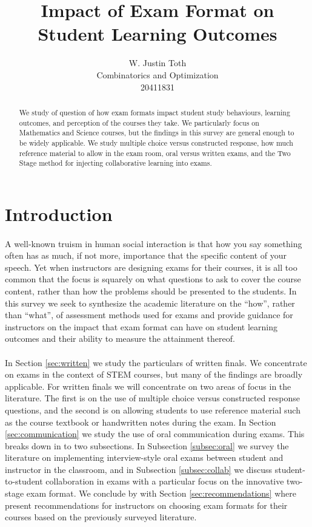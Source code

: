 \documentclass[12pt]{article}
\title{Impact of Exam Format on Student Learning Outcomes}
\author{W. Justin Toth\\Combinatorics and Optimization\\20411831}
\begin{document}
\maketitle
\begin{abstract}
We study of question of how exam formats impact student study behaviours, learning outcomes, and perception of the courses they take. We particularly focus on Mathematics and Science courses, but the findings in this survey are general enough to be widely applicable. We study multiple choice versus constructed response, how much reference material to allow in the exam room, oral versus written exams, and the Two Stage method for injecting collaborative learning into exams.
\end{abstract}
\newpage
\tableofcontents
\newpage
\section{Introduction}

\paragraph{}
A well-known truism in human social interaction is that how you say something often has as much, if not more, importance that the specific content of your speech. Yet when instructors are designing exams for their courses, it is all too common that the focus is squarely on what questions to ask to cover the course content, rather than how the problems should be presented to the students. In this survey we seek to synthesize the academic literature on the ``how'', rather than ``what'', of assessment methods used for exams and provide guidance for instructors on the impact that exam format can have on student learning outcomes and their ability to measure the attainment thereof.
\paragraph{}
In Section \ref{sec:written} we study the particulars of written finals. We concentrate on exams in the context of STEM courses, but many of the findings are broadly applicable. For written finals we will concentrate on two areas of focus in the literature. The first is on the use of multiple choice versus constructed response questions, and the second is on allowing students to use reference material such as the course textbook or handwritten notes during the exam. In Section \ref{sec:communication} we study the use of oral communication during exams. This breaks down in to two subsections. In Subsection \ref{subsec:oral} we survey the literature on implementing interview-style oral exams  between student and instructor in the classroom, and in Subsection \ref{subsec:collab} we discuss student-to-student collaboration in exams with a particular focus on the innovative two-stage exam format. We conclude by with Section \ref{sec:recommendations} where present recommendations for instructors on choosing exam formats for their courses based on the previously surveyed literature.
\end{document}
